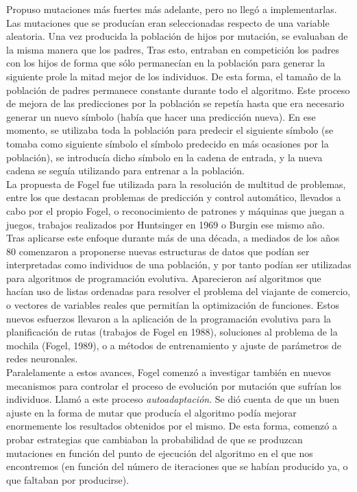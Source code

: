 \documentclass[12pt]{article} \usepackage[utf8x]{inputenc}
\begin{document}
Propuso mutaciones más fuertes más adelante, pero no llegó a
implementarlas. Las mutaciones que se producían eran seleccionadas
respecto de una variable aleatoria. Una vez producida la población de
hijos por mutación, se evaluaban de la misma manera que los padres,
Tras esto, entraban en competición los padres con los hijos de forma
que sólo permanecían en la población para generar la siguiente prole
la mitad mejor de los individuos. De esta forma, el tamaño de la
población de padres permanece constante durante todo el algoritmo.
Este proceso de mejora de las predicciones por la población se repetía
hasta que era necesario generar un nuevo símbolo (había que hacer una
predicción nueva). En ese momento, se utilizaba toda la población para
predecir el siguiente símbolo (se tomaba como siguiente símbolo el
símbolo predecido en más ocasiones por la población), se introducía
dicho símbolo en la cadena de entrada, y la nueva cadena se seguía
utilizando para entrenar a la población.\\

La propuesta de Fogel fue utilizada para la resolución de multitud de
problemas, entre los que destacan problemas de predicción y control
automático, llevados a cabo por el propio Fogel, o reconocimiento de
patrones y máquinas que juegan a juegos, trabajos realizados por
Huntsinger en 1969 o Burgin ese mismo año.\\

Tras aplicarse este enfoque durante más de una década, a mediados de
los años 80 comenzaron a proponerse nuevas estructuras de datos que
podían ser interpretadas como individuos de una población, y por tanto
podían ser utilizadas para algoritmos de programación
evolutiva. Aparecieron así algoritmos que hacían uso de listas
ordenadas para resolver el problema del viajante de comercio, o
vectores de variables reales que permitían la optimización de
funciones. Estos nuevos esfuerzos llevaron a la aplicación de la
programación evolutiva para la planificación de rutas (trabajos de
Fogel en 1988), soluciones al problema de la mochila (Fogel, 1989), o
a métodos de entrenamiento y ajuste de parámetros de redes neuronales.\\

Paralelamente a estos avances, Fogel comenzó a investigar también en
nuevos mecanismos para controlar el proceso de evolución por mutación
que sufrían los individuos. Llamó a este proceso
\textit{autoadaptación}.  Se dió cuenta de que un buen ajuste en la
forma de mutar que producía el algoritmo podía mejorar enormemente los
resultados obtenidos por el mismo. De esta forma, comenzó a probar
estrategias que cambiaban la probabilidad de que se produzcan
mutaciones en función del punto de ejecución del algoritmo en el que
nos encontremos (en función del número de iteraciones que se habían
producido ya, o que faltaban por producirse).\\
\end{document}
